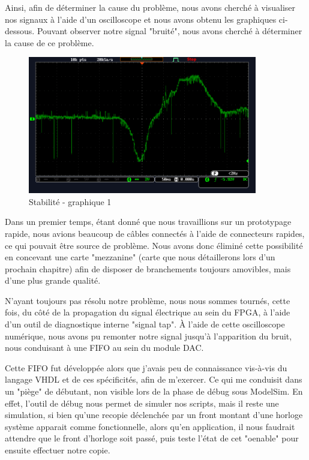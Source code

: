 \documentclass[french,a4paper,12pt]{report}
\begin{document}
		Ainsi, afin de déterminer la cause du problème, nous avons cherché à visualiser nos signaux à l'aide d'un oscilloscope et nous avons obtenu les graphiques ci-dessous. Pouvant observer notre signal "bruité", nous avons cherché à déterminer la cause de ce problème.
		
		\begin{figure}[!ht]
    \center
  	\includegraphics[width=10cm]{bruit1.PNG}
		\caption{Stabilité - graphique 1}
	\end{figure}
	
	Dans un premier temps, étant donné que nous travaillions sur un prototypage rapide, nous avions beaucoup de câbles connectés à l'aide de connecteurs rapides, ce qui pouvait être source de problème. Nous avons donc éliminé cette possibilité en concevant une carte "mezzanine" (carte que nous détaillerons lors d'un prochain chapitre) afin de disposer de branchements toujours amovibles, mais d'une plus grande qualité.
	
	N'ayant toujours pas résolu notre problème, nous nous sommes tournés, cette fois, du côté de la propagation du signal électrique au sein du FPGA, à l'aide d'un outil de diagnostique interne "signal tap". À l'aide de cette oscilloscope numérique, nous avons pu remonter notre signal jusqu'à l'apparition du bruit, nous conduisant à une FIFO au sein du module DAC.
	
	Cette FIFO fut développée alors que j'avais peu de connaissance vis-à-vis du langage VHDL et de ces spécificités, afin de m'exercer. Ce qui me conduisit dans un "piège" de débutant, non visible lors de la phase de débug sous ModelSim. En effet, l'outil de débug nous permet de simuler nos scripts, mais il reste une simulation, si bien qu'une recopie déclenchée par un front montant d'une horloge système apparait comme fonctionnelle, alors qu'en application, il nous faudrait attendre que le front d'horloge soit passé, puis teste l'état de cet "oenable" pour ensuite effectuer notre copie.
	
\end{document}
